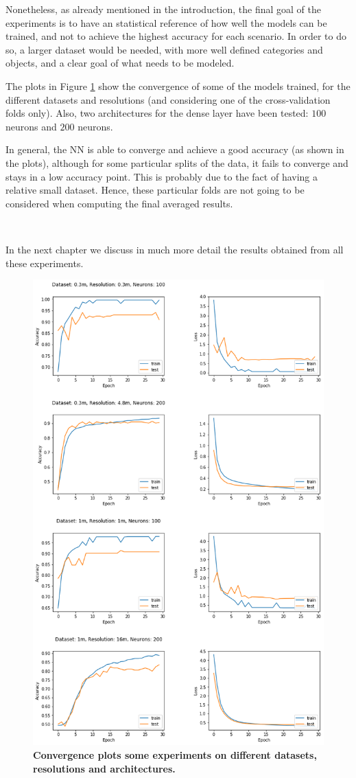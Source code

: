 Nonetheless, as already mentioned in the introduction, the final goal of the experiments is to have an statistical reference of how well the models can be trained, and not to achieve the highest accuracy for each scenario. In order to do so, a larger dataset would be needed, with more well defined categories and objects, and a clear goal of what needs to be modeled.

The plots in Figure \ref{fig:conv_plots} show the convergence of some of the models trained, for the different datasets and resolutions (and considering one of the cross-validation folds only). Also, two architectures for the dense layer have been tested: $100$ neurons and $200$ neurons. 

In general, the NN is able to converge and achieve a good accuracy (as shown in the plots), although for some particular splits of the data, it fails to converge and stays in a low accuracy point. This is probably due to the fact of having a relative small dataset. Hence, these particular folds are not going to be considered when computing the final averaged results.

\

In the next chapter we discuss in much more detail the results obtained from all these experiments.

\begin{figure}[h!]
	\centering
	\includegraphics[width=\textwidth]{Figures/results/convergence_plots_all_res.png}
	\captionsetup{width=1\linewidth}
	\caption{\textbf{Convergence plots some experiments on different datasets, resolutions and architectures.}}
	\label{fig:conv_plots}
\end{figure}


